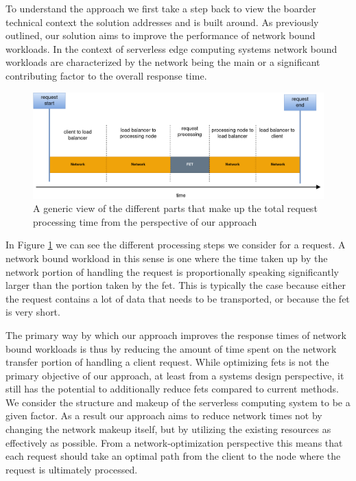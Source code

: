 \documentclass[draft,final]{vutinfth} %
\begin{document}
To understand the approach we first take a step back to view the boarder technical context the solution addresses and is built around.
As previously outlined, our solution aims to improve the performance of network bound workloads.
In the context of serverless edge computing systems network bound workloads are characterized by the network being the main or a significant contributing factor to the overall response time.
\begin{figure}
    \centering
    \includegraphics[width=14cm]{graphics/diagrams/request_overview.png}
    \caption{A generic view of the different parts that make up the total request processing time from the perspective of our approach}
    \label{fig:request_net_fet_overview}
\end{figure}
In Figure \ref{fig:request_net_fet_overview} we can see the different processing steps we consider for a request.
A network bound workload in this sense is one where the time taken up by the network portion of handling the request is proportionally speaking significantly larger than the portion taken by the \gls{fet}.
This is typically the case because either the request contains a lot of data that needs to be transported, or because the \gls{fet} is very short.

The primary way by which our approach improves the response times of network bound workloads is thus by reducing the amount of time spent on the network transfer portion of handling a client request.
While optimizing \glspl{fet} is not the primary objective of our approach, at least from a systems design perspective, it still has the potential to additionally reduce \glspl{fet} compared to current methods.
We consider the structure and makeup of the serverless computing system to be a given factor. As a result our approach aims to reduce network times not by changing the network makeup itself, but by utilizing the existing resources as effectively as possible. From a network-optimization perspective this means that each request should take an optimal path from  the client to the node where the request is ultimately processed. 
\end{document}

